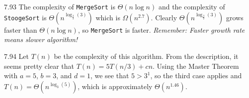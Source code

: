 \begin{Answer}{7.93}
The complexity of \verb+MergeSort+ is $\Theta(n\log n)$ and the complexity of
\verb+StoogeSort+ is $\Theta\left(n^{\log_\frac{3}{2}(3)}\right)$
which is $\Omega(n^{2.7})$.
Clearly $\Theta\left(n^{\log_\frac{3}{2}(3)}\right)$ grows faster than $\Theta(n\log n)$,
so \verb+MergeSort+ is faster.
{\em Remember: Faster growth rate means slower algorithm!}
\end{Answer}
\begin{Answer}{7.94}
Let $T(n)$ be the complexity of this algorithm.
From the description, it seems pretty clear that $T(n)=5T(n/3)+cn$.
Using the Master Theorem with $a=5$, $b=3$, and $d=1$, we see that $5>3^1$,
so the third case applies and $T(n)=\Theta\left(n^{\log_3(5)}\right)$,
which is approximately $\Theta(n^{1.46})$.
\end{Answer}
